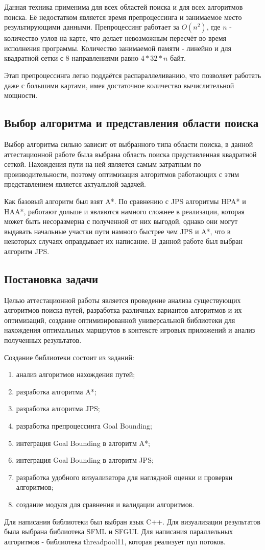 Данная техника применима для всех областей поиска и для всех алгоритмов поиска. Её недостатком является время препроцессинга и занимаемое место результирующими данными. Препроцессинг работает за $O(n^2)$, где $n$ - количество узлов на карте, что делает невозможным пересчёт во время исполнения программы. Количество занимаемой памяти - линейно и для квадратной сетки с 8 направлениями равно $ 4 * 32 * n$ байт.

Этап препроцессинга легко поддаётся распараллеливанию, что позволяет работать даже с большими картами, имея достаточное количество вычислительной мощности.  

\subsection{Выбор алгоритма и представления области поиска}

Выбор алгоритма сильно зависит от выбранного типа области поиска, в данной аттестационной работе была выбрана область поиска представленная квадратной сеткой. Нахождения пути на ней является самым затратным по производительности, поэтому оптимизация алгоритмов работающих с этим представлением является актуальной задачей. 

Как базовый алгоритм был взят A*. По сравнению с JPS алгоритмы HPA* и HAA*, работают дольше и являются намного сложнее в реализации, которая может быть несоразмерна с полученной от них выгодой, однако они могут выдавать начальные участки пути намного быстрее чем JPS и A*, что в некоторых случаях оправдывает их написание. В данной работе был выбран алгоритм JPS.  


\subsection{Постановка задачи}

Целью аттестационной работы является проведение анализа существующих алгоритмов поиска путей, разработка различных вариантов алгоритмов и их оптимизаций, создание оптимизированной универсальной библиотеки для нахождения оптимальных маршрутов в контексте игровых приложений и анализ полученных результатов. 

Создание библиотеки состоит из заданий:

\begin{enumerate}
    \item анализ алгоритмов нахождения путей;
    \item разработка алгоритма A*;
    \item разработка алгоритма JPS;
    \item разработка препроцессинга Goal Bounding;
    \item интеграция Goal Bounding в алгоритм A*;
    \item интеграция Goal Bounding в алгоритм JPS;
    \item разработка удобного визуализатора для наглядной оценки и проверки алгоритмов;
    \item создание модуля для сравнения и валидации алгоритмов.
\end{enumerate}

Для написания библиотеки был выбран язык C++. Для визуализации результатов была выбрана библиотека SFML и SFGUI. Для написания параллельных алгоритмов - библиотека threadpool11, которая реализует пул потоков.